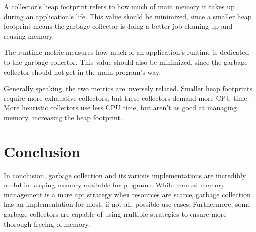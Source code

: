 \documentclass[12pt]{article}
\begin{document}
A collector's heap footprint refers to how much of main memory it takes up during an application's life. This value should be minimized, since a smaller heap footprint means the garbage collector is doing a better job cleaning up and reusing memory.

The runtime metric measures how much of an application's runtime is dedicated to the garbage collector. This value should also be minimized, since the garbage collector should not get in the main program's way.

Generally speaking, the two metrics are inversely related. Smaller heap footprints require more exhaustive collectors, but these collectors demand more CPU time. More heuristic collectors use less CPU time, but aren't as good at managing memory, increasing the heap footprint. \cite{perform}
\section{Conclusion}
In conclusion, garbage collection and its various implementations are incredibly useful in keeping memory available for programs. While manual memory management is a more apt strategy when resources are scarce, garbage collection has an implementation for most, if not all, possible use cases. Furthermore, some garbage collectors are capable of using multiple strategies to ensure more thorough freeing of memory.
\newpage


\end{document}
